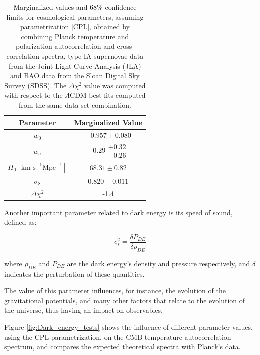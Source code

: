 \documentclass[openany,a4paper,12pt,oneside]{book}
\begin{document}
\begin{spacing}{1.5}
\begin{table}[!htb]
    \centering
    \begin{tabular}{cc} \hline
     Parameter & Marginalized Value \\ \hline
     $w_0$ & $-0.957\pm0.080$\\
     $w_a$ & $-0.29\substack{+0.32 \\ -0.26}$\\
     $H_0 [\text{km s}^{-1}\text{Mpc}^{-1}]$ & $68.31\pm0.82$ \\
     $\sigma_8$ & $0.820\pm 0.011$\\ \hline
     $\Delta \chi^2$ & -1.4 \\ \hline
    \end{tabular}
    \caption{Marginalized values and $68\%$ confidence limits for cosmological parameters, assuming parametrization \eqref{CPL}, obtained by combining Planck temperature and polarization autocorrelation and cross-correlation spectra\cite{Planck_spectra}, type IA supernovae data from the Joint Light Curve Analysis (JLA)\cite{JLA} and BAO data from the Sloan Digital Sky Survey (SDSS)\cite{SDSS}. The $\Delta \chi^2$ value was computed with respect to the $\Lambda$CDM best fits computed from the same data set combination.}
    \label{tab:planck_CPL}
\end{table}

Another important parameter related to dark energy is its speed of sound, defined as\cite{DE_sound}:

\begin{equation}\label{ch2:cs_definition}
	c_s^2=\frac{\delta P_{DE}}{\delta \rho_{DE}}
\end{equation}

\noindent where $\rho_{DE}$ and $P_{DE}$ are the dark energy's density and pressure respectively, and $\delta$ indicates the perturbation of these quantities. 

The value of this parameter influences, for instance, the evolution of the gravitational potentials\cite{DE_variable_soundspeed_Linton2018}, and many other factors that relate to the evolution of the universe, thus having an impact on observables. 

Figure \ref{fig:Dark_energy_tests} shows the influence of different parameter values, using the CPL parametrization, on the CMB temperature autocorrelation spectrum, and compares the expected theoretical spectra with Planck's data.



\end{spacing}
\end{document}
